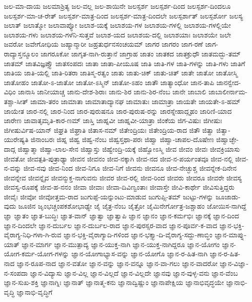 {ಜಲ-ಮಾ-ದಾಯ
ಜಲಮಾಶ್ರಿತ್ಯ
ಜಲ-ವಲ್ಲ
ಜಲ-ಶಾಯಿನೇ
ಜಲಸ್ಪರ್ಶ
ಜಲಸ್ಪರ್ಶ-ದಿಂದ
ಜಲಸ್ಪರ್ಶ-ದಿಂದಲೂ
ಜಲಸ್ಪರ್ಶ-ಮಾ-ಚ-ರೇತ್
ಜಲಸ್ಪರ್ಶ-ಮಾತ್ರ-ದಿಂದ
ಜಲಸ್ಪರ್ಶ-ಮಾತ್ರ-ದಿಂದಲೇ
ಜಲಸ್ಪರ್ಶಾತ್
ಜಲಸ್ಪರ್ಶೋ
ಜಲಸ್ಯ
ಜಲಾತ್
ಜಲಾತ್ಮೋ
ಜಲಾವಾಪ್ಯೋ
ಜಲಾಶ-ಯಕ್ಕೆ
ಜಲಾಶಯ-ಗಳ
ಜಲಾಶಯ-ಗಳಲ್ಲಿ
ಜಲಾಶಯ-ಗಳಲ್ಲಿಯೇ
ಜಲಾಶಯ-ಗಳು
ಜಲಾಶಯ-ಗಳೆನಿ-ಸುತ್ತವೆ
ಜಲಾಶ-ಯದ
ಜಲಾಶಯ-ದಲ್ಲಿ
ಜಲಾಶಯಾಃ
ಜಲಾಶಯೇ
ಜಲೇ
ಜವರೋ
ಜವೇಗೋಧಿಯ
ಜಹ್ಯಾನ್ಮಾರೀ
ಜಹ್ರತುರ್ಧನಸಂಚಯಮ್
ಜಾಗರ
ಜಾಗರಂ
ಜಾಗ-ರಣೆ
ಜಾಗ-ರಾದ್ಯಾಸ್ತನ್ಮೂಲಂ
ಜಾಗರೂಕೋ
ಜಾಗೃತ-ನಾಗಿ-ರುತ್ತಾನೆ
ಜಾಗ್ರಾಹ
ಜಾತಂ
ಜಾತಕದ
ಜಾತಕ್ರುಧೌ
ಜಾತಮದ್ಭು-ತಮ್
ಜಾತಮ್
ಜಾತವಿಜ್ಞಪ್ತ್ಯೌ
ಜಾತಸಂಪದಃ
ಜಾತಾ
ಜಾತಾ-ಪೀಯೂಷ
ಜಾತಿ
ಜಾತಿ-ಗಳ
ಜಾತಿ-ಗಳನ್ನು
ಜಾತಿ-ಗಳು
ಜಾತಿಗೆ
ಜಾತಿಯ
ಜಾತಿ-ಯಲ್ಲಿ
ಜಾತಿ-ರಿತರಾ
ಜಾತಿಸ್ಮ-ರತ್ವಂ
ಜಾತು
ಜಾತು-ಚಿಕ್
ಜಾತು-ಚಿತ್
ಜಾತೇ
ಜಾತೋ
ಜಾತೋಸ್ಮಿ
ಜಾತೋಹಂ
ಜಾತೋ-ಽ-ಜಾತೋ
ಜಾತೋ-ಽಸ್ಮಿನ್
ಜಾತೋ-ಽಹಂ
ಜಾತೌ
ಜಾತ್ಯಾಂಧೋ
ಜಾನ-ತಾಪಿ
ಜಾನನ್ವೇದ-ವಿಧಿಂ
ಜಾನಾಸಿ
ಜಾನೀಯಾಚ್ಚ
ಜಾನು-ದೇಶ-ಶಿರಾಃ
ಜಾನು-ಶಿರ
ಜಾನು-ಶಿರ-ನೆಂಬ
ಜಾನೇ
ಜಾಬಾಲಿ
ಜಾಬಾಲೀರ್ನಾಮ-ತಶ್ಚಾ-ಸೀತ್
ಜಾಮಾ-ತರಂ
ಜಾಮಾತಾ
ಜಾಮಾತಾದ್ಯಾನಘ
ಜಾಮಾತುಃ
ಜಾಮಾತ್ರಾ
ಜಾಯತೇ
ಜಾಯತೇ-ಽ-ಹಮ್
ಜಾಯೇತ
ಜಾರ-ನಲ್ಲಿ
ಜಾರ-ನಿಂದ
ಜಾರ-ಪುರುಷನೂ
ಜಾರ-ಪುರುಷ-ರನ್ನು
ಜಾರಸ್ನೇಹಾದ್ಗೃಹಂ
ಜಾರಿಣಿ-ಯಾದ
ಜಾರೇಣ
ಜಾವಾತೃಮೃತಿ-ಕಾರ-ಣಮ್
ಜಾಸ್ತಿ
ಜಾಹ್ನವೀ
ಜಾಹ್ನವೀ-ಯಾತ್ರಾ
ಜಿಂಕೆಯ
ಜಿಗ-ವಿಷುಃ
ಜಿಗೀಷುಃ
ಜಿಗೀಷುರ್ವಿಷ-ಯಾನ್
ಜಿಘ್ರತಿ
ಜಿಘ್ರಾತಿ
ಜಿತಾಸ-ನಮ್
ಜಿತೇಂದ್ರಿಯಃ
ಜಿತೇಂದ್ರಿಯ-ರಾದ
ಜಿತೌ
ಜಿತ್ವಾ
ಜಿತ್ವಾ-ಯುರೇಷ್ಯತಿ
ಜಿನಾಂಬರಃ
ಜಿಹ್ನ
ಜಿಹ್ವ
ಜಿಹ್ವ-ನೆಂಬ
ಜಿಹ್ವಸ್ತಥಾ-ಪರಃ
ಜಿಹ್ವಾ
ಜಿಹ್ವಾ-ಚಾಪಲ-ದೊಷೇಣ
ಜಿಹ್ವಾಚ್ಛೇ-ದಾದ್ಗ
ಜಿಹ್ವಾತ್ಮಾ
ಜಿಹ್ವಾ-ಲಾಲ-ಸೇನ
ಜಿಹ್ವಾಸ್ತು
ಜಿಹ್ವೇಂದ್ರಿ-ಯಕ್ಕೆ
ಜಿಹ್ವೋಽಸ್ಮಿ
ಜೀವ
ಜೀವಂ
ಜೀವಃ
ಜೀವಕ್ರಿಯಾಸು
ಜೀವತೋ
ಜೀವತ್ಪತಿ-ಪುತ್ರಾಢ್ಯಾ
ಜೀವನ
ಜೀವನಂ
ಜೀವ-ನಕ್ಕಾಗಿ
ಜೀವ-ನದ
ಜೀವ-ನ-ಪರ್ಯಂತವೂ
ಜೀವ-ನಲ್ಲಿ
ಜೀವ-ನ-ವನ್ನು
ಜೀವ-ನವು
ಜೀವ-ನಿಂದ
ಜೀವ-ನಿಗೂ
ಜೀವ-ನಿಗೆ
ಜೀವನು
ಜೀವನೂ
ಜೀವ-ನೇಚ್ಛುಶ್ಚ
ಜೀವನ್ನೇಕ-ದಿನೇನ
ಜೀವನ್ನೇವ
ಜೀವನ್ನೈವ
ಜೀವನ್ಮುಕ್ತ-ನಾಗುವನು
ಜೀವರ
ಜೀವ-ರಲ್ಲಿ
ಜೀವ-ರಿಂದ
ಜೀವರು
ಜೀವರೂ
ಜೀವರೇ
ಜೀವಸ್ಯ
ಜೀವಸ್ವ-ರೂಪಕ್ಕೆ
ಜೀವ-ಹ-ನನಂ
ಜೀವಾ
ಜೀವಾಃ
ಜೀವಾ-ದಿವಿಣ್ವಂತಾಃ
ಜೀವಾಸ್ತೇ
ಜೀವಿ-ಕಾರ್ಥೇ
ಜೀವಿಸುತ್ತಿದ್ದರು
ಜೀವೈಃ
ಜೀವೋ
ಜೀವೋತ್ತಮ-ರಾದ
ಜುಗುಪ್ಪೆ-ಯನ್ನುಂಟು-ಮಾಡುವ
ಜುಗುಪ್ಸಿ-ತಮ್
ಜುಟ್ಟು-ಗಳನ್ನು
ಜೂಜಾಡು-ವುದು
ಜೂಜಿನ
ಜೃಂಭಚ್ಚಂಪಕಶೋಭಾಢ್ಯೇ
ಜೈ
ಜೈತ್ರ-ನೆಂಬ
ಜೈತ್ರೋ
ಜೈಮಿನೇರ್ಗೋತ್ರ-ಜಶ್ಚಾಹಂ
ಜೋಯಿಸ-ನಾಗಿದ್ದೆ
ಜ್ಞಾ
ಜ್ಞಾತಂ
ಜ್ಞಾತ-ಬುದ್ಧಿಃ
ಜ್ಞಾತ-ವಾನ್
ಜ್ಞಾತ್ವಾ
ಜ್ಞಾತ್ವಾಪಿ
ಜ್ಞಾನ
ಜ್ಞಾನಂ
ಜ್ಞಾನ-ಕರ್ಮಭಿಃ
ಜ್ಞಾನಕ್ಕೆ
ಜ್ಞಾನ-ದಿಂದ
ಜ್ಞಾನ-ದಿಂದಲೇ
ಜ್ಞಾನ-ದುರ್ಬಲ
ಜ್ಞಾನ-ದುರ್ಬಲ-ರಾದ
ಜ್ಞಾನ-ಪುರಸ್ಸರ-ವಾದ
ಜ್ಞಾನ-ಪೂರ್ವ-ಕ-ವಾದ
ಜ್ಞಾನ-ಭಕ್ತಿ-ವೈರಾಗ್ಯ-ನಿಧಿ-ಗಳಾ-ಗಿ-ರುವ
ಜ್ಞಾನ-ಭಕ್ತಿ-ವೈರಾಗ್ಯಾದಿ-ಗಳಿಂದ
ಜ್ಞಾನ-ಭಕ್ತ್ಯಾ-ದಿ-ವೈರಾಗ್ಯ-ಸದ್ದು-ಣಾಬ್ಧಿಂ
ಜ್ಞಾನ-ಮಾಪ್ನು-ಯಾತ್
ಜ್ಞಾನ-ಮಾರ್ಗ
ಜ್ಞಾನ-ಮುತ್ಪಾದ್ಯ
ಜ್ಞಾನ-ಯುಕ್ತ-ನಾಗಿ
ಜ್ಞಾನ-ಯುಕ್ತ-ನಾಗಿದ್ದರೂ
ಜ್ಞಾನ-ಯೋಗಂ
ಜ್ಞಾನ-ಯೋಗ-ಕರ್ಮ-ಯೋಗ-ಗಳನ್ನು
ಜ್ಞಾನ-ಯೋಗಾಭ್ಯಾಸ-ವನ್ನು
ಜ್ಞಾನ-ಯೋಗೊ
ಜ್ಞಾನ-ರ-ಹಿತ-ನಾಗಿ
ಜ್ಞಾನ-ರ-ಹಿತ-ನಾದ
ಜ್ಞಾನ-ರೂಪ-ನಾದ
ಜ್ಞಾನ-ವತೋ
ಜ್ಞಾನ-ವನ್ನು
ಜ್ಞಾನ-ವನ್ನೂ
ಜ್ಞಾನ-ವಾ-ಗಲು
ಜ್ಞಾನ-ವಾದರೋ
ಜ್ಞಾನ-ವಿಜ್ಞಾ-ನ-ಸಂಪದಾ
ಜ್ಞಾನ-ವಿದ್ಯಾಸು
ಜ್ಞಾನ-ವಿಲ್ಲ
ಜ್ಞಾನ-ವಿಲ್ಲದೆ
ಜ್ಞಾನ-ವಿಲ್ಲದೇ
ಜ್ಞಾನವು
ಜ್ಞಾನ-ವುಳ್ಳ-ವನು
ಜ್ಞಾನ-ವೆಂಬ
ಜ್ಞಾನ-ಸುಖ-ಶಕ್ತಿ
ಜ್ಞಾನಾಗ್ನಿಃ
ಜ್ಞಾನಾತ್
ಜ್ಞಾನಾತ್ಮ-ಕನು
ಜ್ಞಾನಾದ್ವಿಷ್ಣುಂ
ಜ್ಞಾನಾಪೇಕ್ಷಿಯ
ಜ್ಞಾನಾಭಿವೃದ್ಧಯೇ
ಜ್ಞಾನಾಭಿ-ವೃದ್ಧಿ
ಜ್ಞಾನಾಭಿ-ವೃದ್ಧಿಗೆ
}
